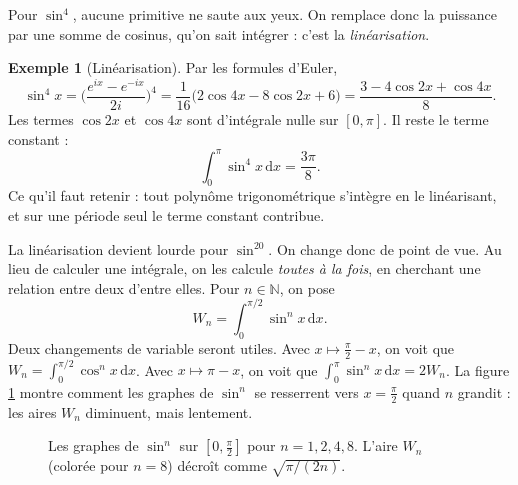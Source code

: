 \documentclass[11pt,a4paper]{article}
\theoremstyle{plain}
\theoremstyle{definition}
\newtheorem{exemple}[theoreme]{Exemple}
\theoremstyle{remark}
\newcommand{\N}{\mathbb{N}}
\newcommand{\dd}{\,\mathrm{d}}
\begin{document}
Pour $\sin^4$, aucune primitive ne saute aux yeux. On remplace donc la puissance par une somme de cosinus, qu'on sait intégrer : c'est la \emph{linéarisation}.

\begin{exemple}[Linéarisation]\label{ex:sin4}
Par les formules d'Euler,
\[
  \sin^4x=\Big(\frac{e^{ix}-e^{-ix}}{2i}\Big)^4=\frac{1}{16}\big(2\cos4x-8\cos2x+6\big)=\frac{3-4\cos2x+\cos4x}{8}.
\]
Les termes $\cos2x$ et $\cos4x$ sont d'intégrale nulle sur $[0,\pi]$. Il reste le terme constant :
\[
  \int_0^\pi\sin^4x\dd x=\frac{3\pi}{8}.
\]
Ce qu'il faut retenir : tout polynôme trigonométrique s'intègre en le linéarisant, et sur une période seul le terme constant contribue.
\end{exemple}

La linéarisation devient lourde pour $\sin^{20}$. On change donc de point de vue. Au lieu de calculer une intégrale, on les calcule \emph{toutes à la fois}, en cherchant une relation entre deux d'entre elles. Pour $n\in\N$, on pose
\[
  W_n=\int_0^{\pi/2}\sin^nx\dd x .
\]
Deux changements de variable seront utiles. Avec $x\mapsto\frac\pi2-x$, on voit que $W_n=\int_0^{\pi/2}\cos^nx\dd x$. Avec $x\mapsto\pi-x$, on voit que $\int_0^\pi\sin^nx\dd x=2W_n$. La figure \ref{fig:wallis} montre comment les graphes de $\sin^n$ se resserrent vers $x=\frac\pi2$ quand $n$ grandit : les aires $W_n$ diminuent, mais lentement.

\begin{figure}[h]
\centering
{}
\caption{Les graphes de $\sin^n$ sur $[0,\frac\pi2]$ pour $n=1,2,4,8$. L'aire $W_n$ (colorée pour $n=8$) décroît comme $\sqrt{\pi/(2n)}$.}\label{fig:wallis}
\end{figure}
\end{document}
